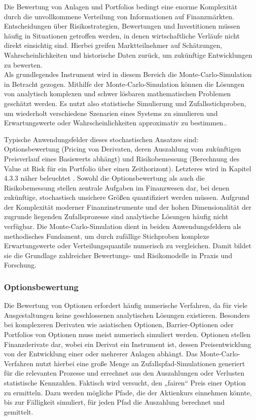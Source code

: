 Die Bewertung von Anlagen und Portfolios bedingt eine enorme Komplexität durch die
unvollkommene Verteilung von Informationen auf Finanzmärkten. Entscheidungen über Risikostrategien, Bewertungen und Investitionen müssen häufig in Situationen getroffen werden, in denen wirtschaftliche Verläufe nicht direkt einsichtig sind. Hierbei greifen Marktteilnehmer auf Schätzungen, Wahrscheinlichkeiten und historische Daten zurück, um zukünftige Entwicklungen zu bewerten. 
\\
 Als grundlegendes Instrument wird in diesem Bereich die Monte-Carlo-Simulation in Betracht gezogen. Mithilfe der Monte-Carlo-Simulation können die Lösungen von analytisch komplexen und schwer lösbaren mathematischen Problemen geschätzt werden. Es nutzt also statistische Simulierung und Zufallsstichproben, um wiederholt verschiedene Szenarien eines Systems zu simulieren und Erwartungswerte oder Wahrscheinlichkeiten approximativ zu bestimmen.\cite{orus_quantum_2019}.
 
Typische Anwendungsfelder dieses stochastischen Ansatzes sind: Optionsbewertung (Pricing von Derivaten, deren Auszahlung vom zukünftigen Preisverlauf eines Basiswerts abhängt) und Risikobemessung (Berechnung des Value at Risk für ein Portfolio über einen Zeithorizont). Letzteres wird in Kapitel 4.3.3 näher beleuchtet \cite{orus_quantum_2019}. Sowohl die Optionsbewertung als auch die Risikobemessung stellen zentrale Aufgaben im Finanzwesen dar, bei denen zukünftige, stochastisch unsichere Größen quantifiziert werden müssen. Aufgrund der Komplexität moderner Finanzinstrumente und der hohen Dimensionalität der zugrunde liegenden Zufallsprozesse sind analytische Lösungen häufig nicht verfügbar. Die Monte-Carlo-Simulation dient in beiden Anwendungsfeldern als methodisches Fundament, um durch zufällige Stichproben komplexe Erwartungswerte oder Verteilungsquantile numerisch zu vergleichen. Damit bildet sie die Grundlage zahlreicher Bewertungs- und Risikomodelle in Praxis und Forschung.

\subsubsection*{Optionsbewertung}
Die Bewertung von Optionen erfordert häufig numerische Verfahren, da für viele Ausgestaltungen keine geschlossenen analytischen Lösungen existieren. Besonders bei komplexeren Derivaten wie asiatischen Optionen, Barrier-Optionen oder Portfolios von Optionen muss meist numerisch simuliert werden. Optionen stellen Finanzderivate dar, wobei ein Derivat ein Instrument ist, dessen Preisentwicklung von der Entwicklung einer oder mehrerer Anlagen abhängt. Das Monte-Carlo-Verfahren nutzt hierbei eine große Menge an Zufallspfad-Simulationen generiert für die relevanten Prozesse und errechnet aus den Auszahlungen oder Verlusten statistische Kennzahlen. Faktisch wird versucht, den „fairen“ Preis einer Option zu ermitteln. Dazu werden mögliche Pfade, die der Aktienkurs einnehmen könnte, bis zur Fälligkeit simuliert, für jeden Pfad die Auszahlung berechnet und gemittelt\cite{orus_quantum_2019}.
 
